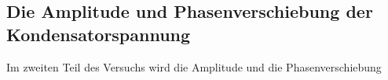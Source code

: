 \subsection{Die Amplitude und Phasenverschiebung der Kondensatorspannung}
Im zweiten Teil des Versuchs wird die Amplitude und die Phasenverschiebung 